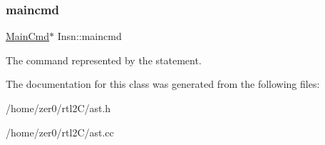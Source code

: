 \subsubsection{\texorpdfstring{maincmd}{maincmd}}
{\footnotesize\ttfamily \hyperlink{class_main_cmd}{Main\+Cmd}$\ast$ Insn\+::maincmd\hspace{0.3cm}{\ttfamily [protected]}}

The command represented by the statement. 

The documentation for this class was generated from the following files\+:\begin{DoxyCompactItemize}
\item 
/home/zer0/rtl2\+C/ast.\+h\item 
/home/zer0/rtl2\+C/ast.\+cc\end{DoxyCompactItemize}
